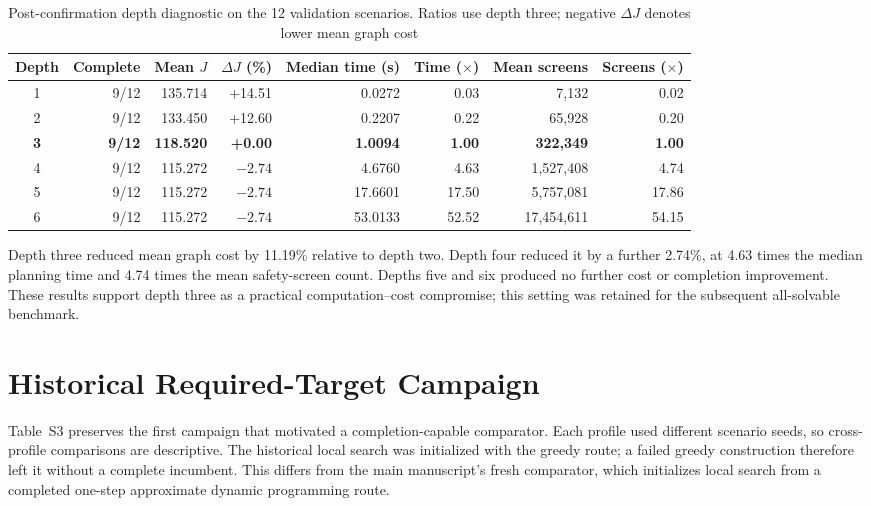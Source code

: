 \documentclass{IEEEtaes}
\begin{document}
\begin{table}[t]
  \centering
  \caption{Post-confirmation depth diagnostic on the 12 validation scenarios. Ratios use depth three; negative $\Delta J$ denotes lower mean graph cost}
  \label{tab:supp-depth-sensitivity}
  \renewcommand{\arraystretch}{1.08}
  \setlength{\tabcolsep}{5pt}
  \footnotesize
  \begin{tabular*}{\linewidth}{@{\extracolsep{\fill}}crrrrrrr@{}}
    \toprule
    Depth & Complete & Mean $J$ & $\Delta J$ (\%) & Median time (s) & Time ($\times$) & Mean screens & Screens ($\times$) \\
    \midrule
    1 & 9/12 & 135.714 & +14.51 & 0.0272 & 0.03 & 7,132 & 0.02 \\
    2 & 9/12 & 133.450 & +12.60 & 0.2207 & 0.22 & 65,928 & 0.20 \\
    \textbf{3} & \textbf{9/12} & \textbf{118.520} & \textbf{+0.00} & \textbf{1.0094} & \textbf{1.00} & \textbf{322,349} & \textbf{1.00} \\
    4 & 9/12 & 115.272 & $-2.74$ & 4.6760 & 4.63 & 1,527,408 & 4.74 \\
    5 & 9/12 & 115.272 & $-2.74$ & 17.6601 & 17.50 & 5,757,081 & 17.86 \\
    6 & 9/12 & 115.272 & $-2.74$ & 53.0133 & 52.52 & 17,454,611 & 54.15 \\
    \bottomrule
  \end{tabular*}
\end{table}

Depth three reduced mean graph cost by 11.19\% relative to depth two. Depth four reduced it by a further 2.74\%, at 4.63 times the median planning time and 4.74 times the mean safety-screen count. Depths five and six produced no further cost or completion improvement. These results support depth three as a practical computation--cost compromise; this setting was retained for the subsequent all-solvable benchmark.

\section{Historical Required-Target Campaign}

Table~S3 preserves the first campaign that motivated a completion-capable comparator. Each profile used different scenario seeds, so cross-profile comparisons are descriptive. The historical local search was initialized with the greedy route; a failed greedy construction therefore left it without a complete incumbent. This differs from the main manuscript's fresh comparator, which initializes local search from a completed one-step approximate dynamic programming route.
\end{document}
